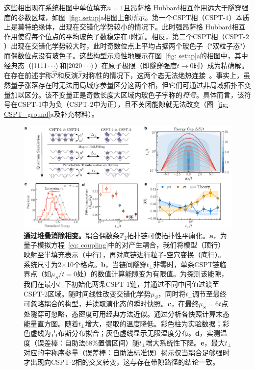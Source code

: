 \documentclass[preprint,superscriptaddress,floatfix, nofootinbib]{revtex4-2}
\begin{document}
\begin{CJK*}{UTF8}{gbsn}
这些相出现在系统相图中单位填充$\bar{n} =1$且昂萨格 Hubbard相互作用远大于隧穿强度的参数区域，如图~\ref{fig: setup}a相图上部所示。第一个CSPT相（CSPT-$1$）本质上是莫特绝缘体，出现在交错化学势较小的情况下。此时强昂萨格 Hubbard相互作用使得每个位点的平均玻色子数稳定在$1$附近。相反，第二个CSPT相（CSPT-$2$）出现在交错化学势较大时，此时奇数位点上平均占据两个玻色子（"双粒子态"）而偶数位点没有玻色子。这些构型示意性地展示在图~\ref{fig: setup}a的相图中，其中经典态（$\ket{1111\cdots}$和$\ket{2020\cdots}$）在原子极限（即隧穿强度$t\to 0$时）成为精确解。在存在前述宇称$\hat{\mathcal P}$和反演$\hat{\mathcal I}$对称性的情况下，这两个态无法绝热连接~\cite{Fuji2015}。事实上，虽然量子涨落存在时无法用局域序参量区分这两个相\cite{Fuji2015}，但它们可通过非局域拓扑不变量加以区分。该不变量正是奇数长度大区域内玻色子宇称的\textit{符号}。具体而言，该符号在CSPT-1中为负（CSPT-2中为正），且不关闭能隙就无法改变（图~\ref{fig: CSPT_ground}a及补充材料）。
\begin{figure}
    \centering
    \includegraphics[width=\textwidth]{figures/Fig_stacking.pdf}
    \caption{\textbf{通过堆叠消除相变。}耦合偶数条$\mathbb{Z}_2$拓扑链可使拓扑性平庸化。\textbf{a}，为量子模拟方程~\eqref{eq: coupling}中的对产生耦合，我们将模型（顶行）映射至半填充表示（中行），再对底链进行粒子-空穴变换（底行）。系统尺寸为2×10个格点。\textbf{b}，当链间隧穿$t_\perp$非零时，单条CSPT链临界点（如$\mu_S/t = 0$处）的数值计算能隙变为有限值。为探测该能隙，我们在最小$t_\perp$下初始化两条CSPT-1链，并通过不同中间值过渡至CSPT-2区域。随时间线性改变交错化学势$\mu_S$，同时将$t_\perp$调节至最终可忽略耦合的构型，并读取演化态的瞬时快照。\textbf{c}，在最终$\mu_S = 6t$点处隧穿可忽略，态密度可用经典方法近似。通过分析各快照计算末态能量直方图。随着$t_\perp$增大，提取的温度降低。彩色柱为实验数据；彩色虚线为吉布斯分布拟合；灰色虚线显示无限温度分布。\textbf{d}，实测温度（误差棒：自助法68\%置信区间）随$t_\perp$增大系统性下降。\textbf{e}，最大$t_\perp$对应的宇称序参量（误差棒：自助法标准误）揭示仅当耦合足够强时才出现向CSPT-2相的交叉转变，这与存在带隙路径的结论一致。}
    \label{fig: Coupled_CSPT}
\end{figure}


\end{CJK*}
\end{document}
